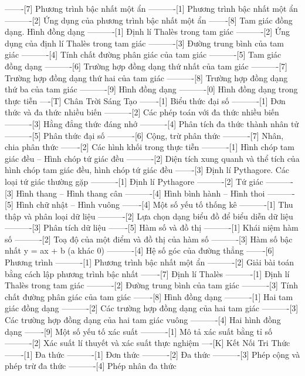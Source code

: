 -------[7] Phương trình bậc nhất một ẩn
----------[1] Phương trình bậc nhất một ẩn
----------[2] Ứng dụng của phương trình bậc nhất một ẩn
-------[8] Tam giác đồng dạng. Hình đồng dạng
----------[1] Định lí Thalès trong tam giác
----------[2] Ứng dụng của định lí Thalès trong tam giác
----------[3] Đường trung bình của tam giác
----------[4] Tính chất đường phân giác của tam giác
----------[5] Tam giác đồng dạng
----------[6] Trường hợp đồng dạng thứ nhất của tam giác
----------[7] Trường hợp đồng dạng thứ hai của tam giác
----------[8] Trường hợp đồng dạng thứ ba của tam giác
----------[9] Hình đồng dạng
----------[0] Hình đồng dạng trong thực tiễn
----[T] Chân Trời Sáng Tạo
-------[1] Biểu thức đại số
----------[1] Đơn thức và đa thức nhiều biến
----------[2] Các phép toán với đa thức nhiều biến
----------[3] Hằng đẳng thức đáng nhớ
----------[4] Phân tích đa thức thành nhân tử
----------[5] Phân thức đại số
----------[6] Cộng, trừ phân thức
----------[7] Nhân, chia phân thức
-------[2] Các hình khối trong thực tiễn
----------[1] Hình chóp tam giác đều – Hình chóp tứ giác đều
----------[2] Diện tích xung quanh và thể tích của hình chóp tam giác đều, hình chóp tứ giác đều
-------[3] Định lí Pythagore. Các loại tứ giác thường gặp
----------[1] Định lí Pythagore
----------[2] Tứ giác
----------[3] Hình thang – Hình thang cân
----------[4] Hình bình hành – Hình thoi
----------[5] Hình chữ nhật – Hình vuông
-------[4] Một số yếu tố thống kê
----------[1] Thu thập và phân loại dữ liệu
----------[2] Lựa chọn dạng biểu đồ để biểu diễn dữ liệu
----------[3] Phân tích dữ liệu
-------[5] Hàm số và đồ thị
----------[1] Khái niệm hàm số
----------[2] Toạ độ của một điểm và đồ thị của hàm số
----------[3] Hàm số bậc nhất y = ax + b (a khác 0)
----------[4] Hệ số góc của đường thẳng
-------[6] Phương trình
----------[1] Phương trình bậc nhất một ẩn
----------[2] Giải bài toán bằng cách lập phương trình bậc nhất
-------[7] Định lí Thalès
----------[1] Định lí Thalès trong tam giác
----------[2] Đường trung bình của tam giác
----------[3] Tính chất đường phân giác của tam giác
-------[8] Hình đồng dạng
----------[1] Hai tam giác đồng dạng
----------[2] Các trường hợp đồng dạng của hai tam giác
----------[3] Các trường hợp đồng dạng của hai tam giác vuông
----------[4] Hai hình đồng dạng
-------[9] Một số yếu tố xác suất
----------[1] Mô tả xác suất bằng tỉ số
----------[2] Xác suất lí thuyết và xác suất thực nghiệm
----[K] Kết Nối Tri Thức
-------[1] Đa thức
----------[1] Đơn thức
----------[2] Đa thức
----------[3] Phép cộng và phép trừ đa thức
----------[4] Phép nhân đa thức
